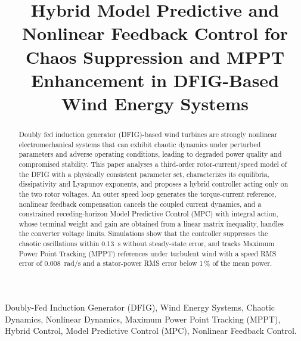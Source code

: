 \documentclass[conference]{IEEEtran}
\begin{document}
\title{Hybrid Model Predictive and Nonlinear Feedback Control for Chaos Suppression and MPPT Enhancement in DFIG-Based Wind Energy Systems}

\author{
\and
{}
\and
{}
}

\maketitle

\begin{abstract}
Doubly fed induction generator (DFIG)-based wind turbines are strongly nonlinear electromechanical systems that can exhibit chaotic dynamics under perturbed parameters and adverse operating conditions, leading to degraded power quality and compromised stability. This paper analyses a third-order rotor-current/speed model of the DFIG with a physically consistent parameter set, characterizes its equilibria, dissipativity and Lyapunov exponents, and proposes a hybrid controller acting only on the two rotor voltages. An outer speed loop generates the torque-current reference, nonlinear feedback compensation cancels the coupled current dynamics, and a constrained receding-horizon Model Predictive Control (MPC) with integral action, whose terminal weight and gain are obtained from a linear matrix inequality, handles the converter voltage limits. Simulations show that the controller suppresses the chaotic oscillations within 0.13~s without steady-state error, and tracks Maximum Power Point Tracking (MPPT) references under turbulent wind with a speed RMS error of 0.008~rad/s and a stator-power RMS error below 1\,\% of the mean power.
\end{abstract}

\begin{IEEEkeywords}
Doubly-Fed Induction Generator (DFIG), Wind Energy Systems, Chaotic Dynamics, Nonlinear Dynamics, Maximum Power Point Tracking (MPPT), Hybrid Control, Model Predictive Control (MPC), Nonlinear Feedback Control.
\end{IEEEkeywords}
\end{document}
